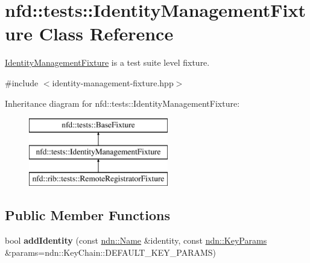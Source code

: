 \hypertarget{classnfd_1_1tests_1_1IdentityManagementFixture}{}\section{nfd\+:\+:tests\+:\+:Identity\+Management\+Fixture Class Reference}
\label{classnfd_1_1tests_1_1IdentityManagementFixture}


\hyperlink{classnfd_1_1tests_1_1IdentityManagementFixture}{Identity\+Management\+Fixture} is a test suite level fixture.  




{\ttfamily \#include $<$identity-\/management-\/fixture.\+hpp$>$}

Inheritance diagram for nfd\+:\+:tests\+:\+:Identity\+Management\+Fixture\+:\begin{figure}[H]
\begin{center}
\leavevmode
\includegraphics[height=3.000000cm]{classnfd_1_1tests_1_1IdentityManagementFixture}
\end{center}
\end{figure}
\subsection*{Public Member Functions}
\begin{DoxyCompactItemize}
\item 
bool {\bfseries add\+Identity} (const \hyperlink{classndn_1_1Name}{ndn\+::\+Name} \&identity, const \hyperlink{classndn_1_1KeyParams}{ndn\+::\+Key\+Params} \&params=ndn\+::\+Key\+Chain\+::\+D\+E\+F\+A\+U\+L\+T\+\_\+\+K\+E\+Y\+\_\+\+P\+A\+R\+A\+MS)\hypertarget{classnfd_1_1tests_1_1IdentityManagementFixture_a17ba40bbf9601ceea563bfa5861835cf}{}\label{classnfd_1_1tests_1_1IdentityManagementFixture_a17ba40bbf9601ceea563bfa5861835cf}

\end{DoxyCompactItemize}

